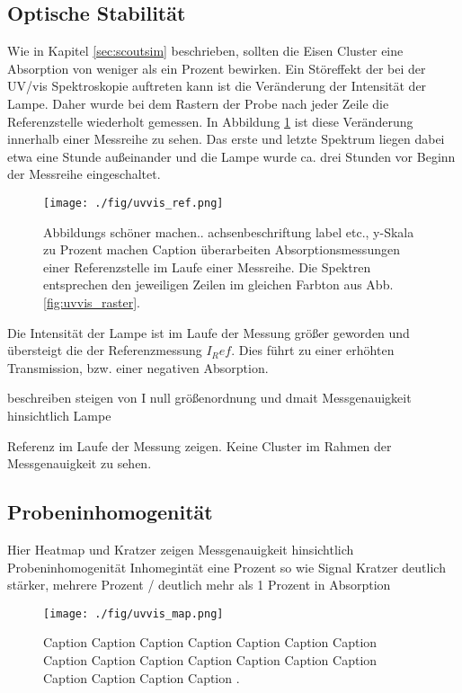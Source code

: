 \subsection{Optische Stabilität}
Wie in Kapitel \ref{sec:scoutsim} beschrieben, sollten die Eisen Cluster eine Absorption von weniger als ein Prozent bewirken.
Ein Störeffekt der bei der UV/vis Spektroskopie auftreten kann ist die Veränderung der Intensität der Lampe. 
Daher wurde bei dem Rastern der Probe nach jeder Zeile die Referenzstelle wiederholt gemessen.
In Abbildung \ref{fig:uvvis_ref} ist diese Veränderung innerhalb einer Messreihe zu sehen.
Das erste und letzte Spektrum liegen dabei etwa eine Stunde außeinander und die Lampe wurde ca. drei Stunden vor Beginn der Messreihe eingeschaltet.
\begin{figure}
    \centering
    \texttt{[image: ./fig/uvvis\_ref.png]}
    \caption{Abbildungs schöner machen.. achsenbeschriftung label etc., y-Skala zu Prozent machen Caption überarbeiten
    Absorptionsmessungen einer Referenzstelle im Laufe einer Messreihe.
    Die Spektren entsprechen den jeweiligen Zeilen im gleichen Farbton aus Abb. \ref{fig:uvvis_raster}.}
    \label{fig:uvvis_ref}
\end{figure}
Die Intensität der Lampe ist im Laufe der Messung größer geworden und übersteigt die der Referenzmessung $I_Ref$. 
Dies führt zu einer erhöhten Transmission, bzw. einer negativen Absorption.

beschreiben steigen von I null
größenordnung und dmait Messgenauigkeit hinsichtlich Lampe







Referenz im Laufe der Messung zeigen.
Keine Cluster im Rahmen der Messgenauigkeit zu sehen.

\subsection{Probeninhomogenität}

Hier Heatmap und Kratzer zeigen
Messgenauigkeit hinsichtlich Probeninhomogenität
Inhomegintät eine Prozent so wie Signal
Kratzer deutlich stärker, mehrere Prozent / deutlich mehr als 1 Prozent in Absorption

\begin{figure}
    \centering
    \texttt{[image: ./fig/uvvis\_map.png]}
    \caption{Caption Caption Caption Caption Caption Caption Caption Caption Caption Caption Caption Caption Caption Caption Caption Caption Caption Caption .}
    \label{fig:uvvis_map}
\end{figure}


